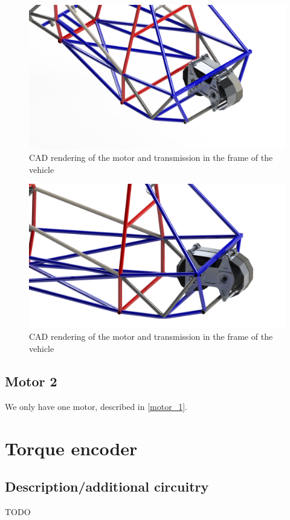 \documentclass{article}
\begin{document}
\begin{figure}[H]
    \centering
    \includegraphics[width = 0.8 \textwidth]{motor_iso}
    \caption{CAD rendering of the motor and transmission in the frame of the vehicle}
    \label{motor_iso}
\end{figure}

\begin{figure}[H]
    \centering
    \includegraphics[width = 0.8 \textwidth]{motor_dimetric}
    \caption{CAD rendering of the motor and transmission in the frame of the vehicle}
    \label{motor_dimetric}
\end{figure}

\subsection{Motor 2}\label{motor_2}
We only have one motor, described in \ref{motor_1}.

\section{Torque encoder}\label{torque_encoder}
\subsection{Description/additional circuitry}
TODO
\end{document}
